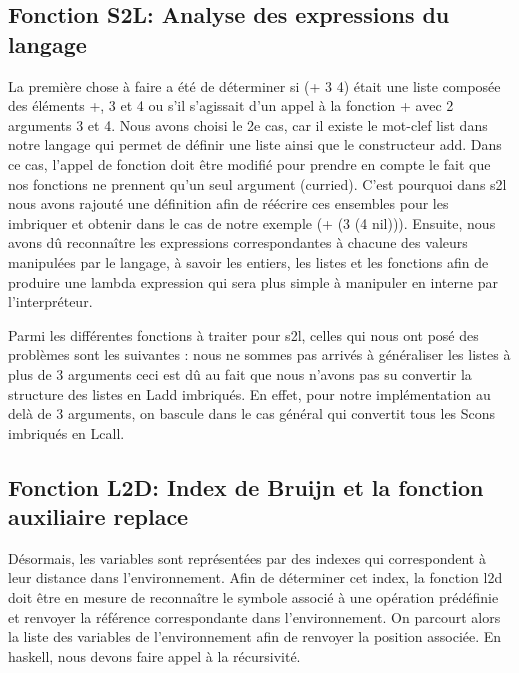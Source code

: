 \documentclass{article}
\begin{document}
\subsection{Fonction S2L: Analyse des expressions du langage}
La première chose à faire a été de déterminer si (+ 3 4) était une liste composée des éléments +, 3 et 4 ou s'il s'agissait d'un appel à la fonction + avec 2 arguments 3 et 4. Nous avons choisi le 2e cas, car il existe le mot-clef list dans notre langage qui permet de définir une liste ainsi que le constructeur add.
Dans ce cas, l'appel de fonction doit être modifié pour prendre en compte le fait que nos fonctions ne prennent qu'un seul argument (curried). C'est pourquoi dans s2l nous avons rajouté une définition afin de réécrire ces ensembles pour les imbriquer et obtenir dans le cas de notre exemple (+ (3 (4 nil))).
Ensuite, nous avons dû reconnaître les expressions correspondantes à chacune des valeurs manipulées par le langage, à savoir les entiers, les listes et les fonctions afin de produire une lambda expression qui sera plus simple à manipuler en interne par l'interpréteur.
\newline 

Parmi les différentes fonctions à traiter pour s2l, celles qui nous ont posé des problèmes sont les suivantes : nous ne sommes pas arrivés à généraliser les listes à plus de 3 arguments ceci est dû au fait que nous n'avons pas su convertir la structure des listes en Ladd imbriqués. En effet, pour notre implémentation au delà de 3 arguments, on bascule dans le cas général qui convertit tous les Scons imbriqués en Lcall.



\subsection{Fonction L2D: Index de Bruijn et la fonction auxiliaire replace}
Désormais, les variables sont représentées par des indexes qui correspondent à leur distance dans l'environnement. Afin de déterminer cet index, la fonction l2d doit être en mesure de reconnaître le symbole associé à une opération prédéfinie et renvoyer la référence correspondante dans l'environnement. On parcourt alors la liste des variables de l'environnement afin de renvoyer la position associée. En haskell, nous devons faire appel à la récursivité.
\newline 
\end{document}
